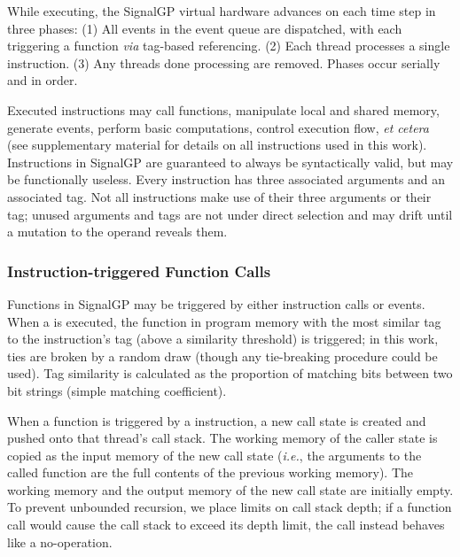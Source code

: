 While executing, the SignalGP virtual hardware advances on each time step in three phases: 
(1) All events in the event queue are dispatched, with each triggering a function \textit{via} tag-based referencing. 
(2) Each thread processes a single instruction. 
(3) Any threads done processing are removed.
Phases occur serially and in order. 

Executed instructions may call functions, manipulate local and shared memory, generate events, perform basic computations, control execution flow, \textit{et cetera} (see supplementary material \citep{signalgp_supplement_2018} for details on all instructions used in this work).
Instructions in SignalGP are guaranteed to always be syntactically valid, but may be functionally useless. 
Every instruction has three associated arguments and an associated tag. 
Not all instructions make use of their three arguments or their tag; unused arguments and tags are not under direct selection and may drift until a mutation to the operand reveals them.

\subsubsection{Instruction-triggered Function Calls}

Functions in SignalGP may be triggered by either instruction calls or events.
When a  is executed, the function in program memory with the most similar tag to the  instruction's tag (above a similarity threshold) is triggered; in this work, ties are broken by a random draw (though any tie-breaking procedure could be used).  
Tag similarity is calculated as the proportion of matching bits between two bit strings (simple matching coefficient).  

When a function is triggered by a  instruction, a new call state is created and pushed onto that thread's call stack.
The working memory of the caller state is copied as the input memory of the new call state (\textit{i.e.}, the arguments to the called function are the full contents of the previous working memory). 
The working memory and the output memory of the new call state are initially empty. 
To prevent unbounded recursion, we place limits on call stack depth; if a function call would cause the call stack to exceed its depth limit, the call instead behaves like a no-operation. 


